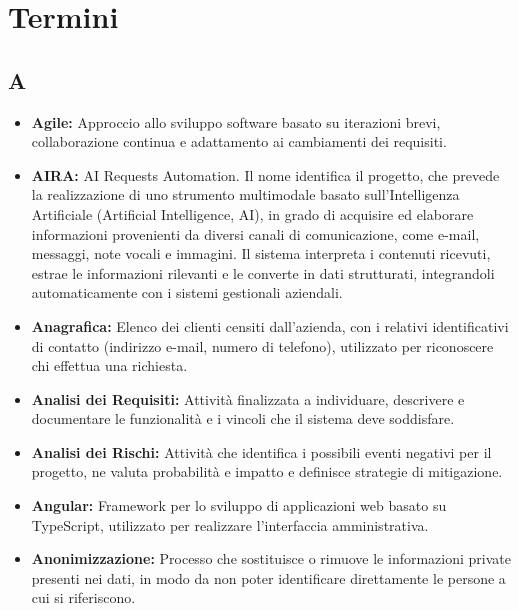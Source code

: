 
\section{Termini}


{}
\subsection*{A}

\begin{itemize}
    \item \textbf{Agile:} Approccio allo sviluppo software basato su iterazioni brevi, collaborazione continua e adattamento ai cambiamenti dei requisiti.
    \item \textbf{AIRA:} AI Requests Automation. Il nome identifica il progetto, che prevede la realizzazione di uno strumento multimodale basato sull'Intelligenza Artificiale (Artificial Intelligence, AI), in grado di acquisire ed elaborare informazioni provenienti da diversi canali di comunicazione, come e-mail, messaggi, note vocali e immagini. Il sistema interpreta i contenuti ricevuti, estrae le informazioni rilevanti e le converte in dati strutturati, integrandoli automaticamente con i sistemi gestionali aziendali.
    \item \textbf{Anagrafica:} Elenco dei clienti censiti dall'azienda, con i relativi identificativi di contatto (indirizzo e-mail, numero di telefono), utilizzato per riconoscere chi effettua una richiesta.
    \item \textbf{Analisi dei Requisiti:} Attività finalizzata a individuare, descrivere e documentare le funzionalità e i vincoli che il sistema deve soddisfare.
    \item \textbf{Analisi dei Rischi:} Attività che identifica i possibili eventi negativi per il progetto, ne valuta probabilità e impatto e definisce strategie di mitigazione.
    \item \textbf{Angular:} Framework per lo sviluppo di applicazioni web basato su TypeScript, utilizzato per realizzare l'interfaccia amministrativa.
    \item \textbf{Anonimizzazione:} Processo che sostituisce o rimuove le informazioni private presenti nei dati, in modo da non poter identificare direttamente le persone a cui si riferiscono.

\end{itemize}
